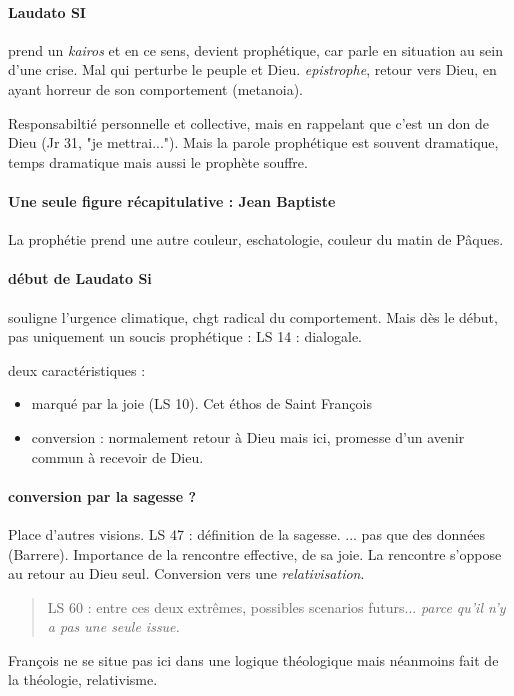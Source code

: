 \paragraph{Laudato SI} prend un \textit{kairos} et en ce sens, devient prophétique, car parle en situation au sein d'une crise. Mal qui perturbe le peuple et Dieu. \textit{epistrophe}, retour vers Dieu, en ayant horreur de son comportement (metanoia).

Responsabiltié personnelle et collective, mais en rappelant que c'est un don de Dieu (Jr 31, "je mettrai...").
Mais la parole prophétique est souvent dramatique, temps dramatique mais aussi le prophète souffre.
\paragraph{Une seule figure récapitulative : Jean Baptiste } La prophétie prend une autre couleur, eschatologie, couleur du matin de Pâques. 

\paragraph{début de Laudato Si} souligne l'urgence climatique, chgt radical du comportement. Mais dès le début, pas uniquement un soucis prophétique : 
LS 14 : dialogale. 

deux caractéristiques :
\begin{itemize}
    \item marqué par la joie (LS 10). Cet éthos de Saint François
    \item conversion : normalement retour à Dieu mais ici, promesse d'un avenir commun à recevoir de Dieu. 
\end{itemize}

\paragraph{conversion par la sagesse ?} Place d'autres visions. 
LS 47 : définition de la sagesse. ... pas que des données (Barrere). 
Importance de la rencontre effective, de sa joie.
La rencontre s'oppose au retour au Dieu seul.
Conversion vers une \textit{relativisation}. 

\begin{quote}
LS 60 : entre ces deux extrêmes, possibles scenarios futurs... \textit{parce qu'il n'y a pas une seule issue.}
    
\end{quote}

François ne se situe pas ici dans une logique théologique mais néanmoins fait de la théologie, relativisme.

